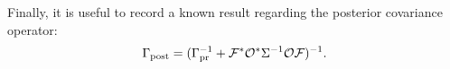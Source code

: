 





Finally, it is useful to record a known result regarding the posterior
covariance operator:
\begin{align}\label{eq:postcov}
  \postcov = (\prcov^{-1} + \fwd^* \obs^* \Sigma^{-1} \obs \fwd
  )^{-1}.
\end{align}


